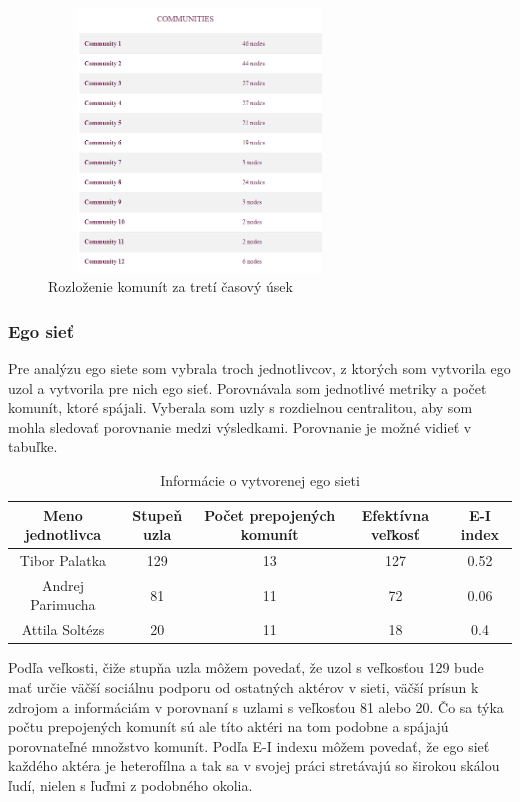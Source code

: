 \documentclass[slovak,master,public,dept460,male,cpdeclaration,oneside]{diploma}
\begin{document}
\begin{figure}[H]
\centering
\includegraphics[width=8cm, height=7cm]{figures/team_communities_tab_third}
\caption{Rozloženie komunít za tretí časový úsek}
\label{team_communities_third}
\end{figure}



\subsubsection{Ego sieť}
Pre analýzu ego siete som vybrala troch jednotlivcov, z ktorých som vytvorila ego uzol a vytvorila pre nich ego sieť. Porovnávala som jednotlivé metriky a počet komunít, ktoré spájali. Vyberala som uzly s rozdielnou centralitou, aby som mohla sledovať porovnanie medzi výsledkami. Porovnanie je možné vidieť v tabuľke.

\begin{table}[h!]
\centering
\begin{tabular}{ |c|c|c|c|c| }
 \hline
 Meno jednotlivca & Stupeň uzla & Počet prepojených komunít & Efektívna veľkosť & E-I index \\ 
 \hline
 Tibor Palatka    & 129  & 13  & 127  &  0.52 \\  
  \hline
 Andrej Parimucha &  81  &  11 & 72 & 0.06  \\ 
  \hline
 Attila Soltézs   & 20   &  11 &  18 & 0.4  \\ 
  \hline

\end{tabular}
\caption{Informácie o vytvorenej ego sieti}
\end{table} 


Podľa veľkosti, čiže stupňa uzla môžem povedať, že uzol s veľkosťou 129 bude mať určie väčší sociálnu podporu od ostatných aktérov v sieti, väčší prísun k zdrojom a informáciám v porovnaní s uzlami s veľkosťou 81 alebo 20. Čo sa týka počtu prepojených komunít sú ale títo aktéri na tom podobne a spájajú porovnateľné množstvo komunít. Podľa E-I indexu môžem povedať, že ego sieť každého aktéra je heterofílna a tak sa v svojej práci stretávajú so širokou skálou ľudí, nielen s ľuďmi z podobného okolia.
\end{document}

